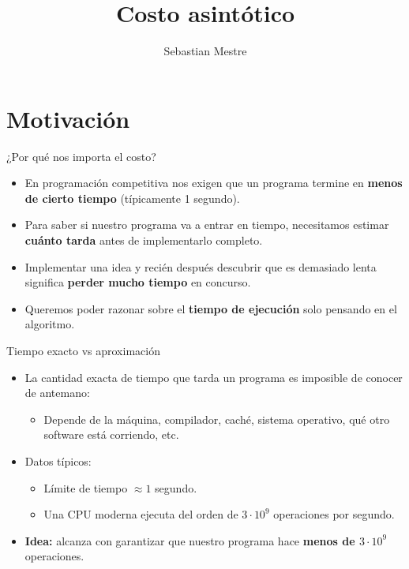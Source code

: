 \documentclass[aspectratio=169]{beamer}
\title{Costo asintótico}
\author{Sebastian Mestre}
\date{}
\begin{document}
\begin{frame}
  \titlepage
\end{frame}

\section{Motivación}

\begin{frame}{¿Por qué nos importa el costo?}
  \begin{itemize}
    \item En programación competitiva nos exigen que un programa termine en \textbf{menos de cierto tiempo} (típicamente 1 segundo).
    \item Para saber si nuestro programa va a entrar en tiempo, necesitamos estimar \textbf{cuánto tarda} antes de implementarlo completo.
    \item Implementar una idea y recién después descubrir que es demasiado lenta significa \textbf{perder mucho tiempo} en concurso.
    \item Queremos poder razonar sobre el \textbf{tiempo de ejecución} solo pensando en el algoritmo.
  \end{itemize}
\end{frame}

\begin{frame}{Tiempo exacto vs aproximación}
  \begin{itemize}
    \item La cantidad exacta de tiempo que tarda un programa es imposible de conocer de antemano:
      \begin{itemize}
        \item Depende de la máquina, compilador, caché, sistema operativo, qué otro software está corriendo, etc.
      \end{itemize}
    \item Datos típicos:
      \begin{itemize}
        \item Límite de tiempo \(\approx 1\) segundo.
        \item Una CPU moderna ejecuta del orden de \(3 \cdot 10^9\) operaciones por segundo.
      \end{itemize}
    \item \textbf{Idea:} alcanza con garantizar que nuestro programa hace \textbf{menos de \(3 \cdot 10^9\)} operaciones.
  \end{itemize}
\end{frame}
\end{document}
